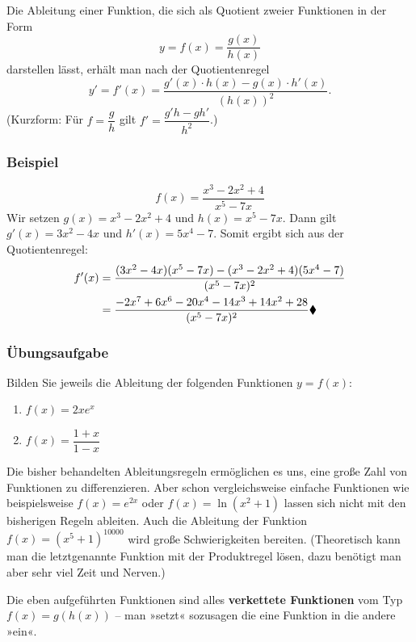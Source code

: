 
Die Ableitung einer Funktion, die sich als Quotient zweier Funktionen in der Form
\[ y = f(x) = \frac{g(x)}{h(x)} \]
darstellen lässt, erhält man nach der Quotientenregel
\[ y' = f'(x) = \frac{g'(x) \cdot h(x) - g(x) \cdot h'(x)}{(h(x))^2} . \]
(Kurzform: Für $f = \dfrac{g}{h}$ gilt $f' = \dfrac{g'h - gh'}{h^2}$.)

\subsubsection{Beispiel}

\[ f(x) = \frac{x^3 - 2x^2 + 4}{x^5 - 7x} \]
Wir setzen $g(x) = x^3 - 2x^2 + 4$ und $h(x) = x^5 - 7x$. Dann gilt $g'(x) = 3x^2 - 4x$ und $h'(x) = 5x^4 - 7$. Somit ergibt sich aus der Quotientenregel:
\begin{align*}
  f'(x) &= \frac{(3x^2 - 4x)(x^5 - 7x) - (x^3 - 2x^2 + 4)(5x^4 - 7)}{(x^5 - 7x)^2}\\
  &= \frac{-2x^7 + 6x^6 - 20x^4 - 14x^3 + 14x^2 + 28}{(x^5 - 7x)^2}\beispielende
\end{align*}

\subsubsection{Übungsaufgabe}

\begin{graukasten}
  Bilden Sie jeweils die Ableitung der folgenden Funktionen $y = f(x)$:
  \begin{enumerate}[label=\alph*)]
    \item $f(x) = 2x e^x$
    \item $f(x) = \dfrac{1 + x}{1 - x}$
  \end{enumerate}
\end{graukasten}

Die bisher behandelten Ableitungsregeln ermöglichen es uns, eine große Zahl von Funktionen zu differenzieren. Aber schon vergleichsweise einfache Funktionen wie beispielsweise $f(x) = e^{2x}$ oder $f(x) = \ln(x^2 + 1)$ lassen sich nicht mit den bisherigen Regeln ableiten. Auch die Ableitung der Funktion $f(x) = (x^5 + 1)^{10000}$ wird große Schwierigkeiten bereiten. (Theoretisch kann man die letztgenannte Funktion mit der Produktregel lösen, dazu benötigt man aber sehr viel Zeit und Nerven.)

Die eben aufgeführten Funktionen sind alles \textbf{verkettete Funktionen} vom Typ $f(x) = g(h(x))$ -- man »setzt« sozusagen die eine Funktion in die andere »ein«.

